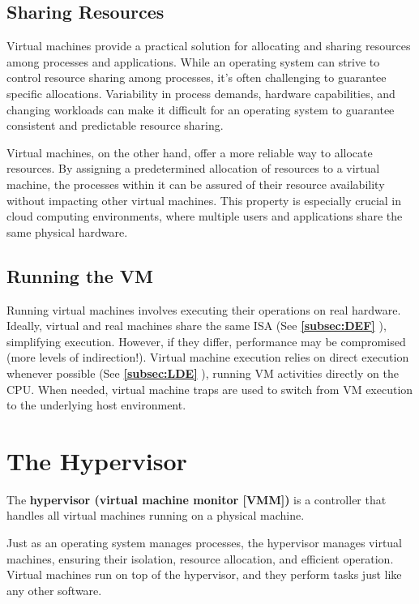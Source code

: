 \documentclass{report}
\newcommand{\definitionBegin}[1]{\begin{tcolorbox}[title={Definition: #1}]}
\newcommand{\definitionEnd}{\end{tcolorbox}}
\newcommand{\refto}[2]{\textbf{\ref{#1:#2} \nameref{#1:#2}}}
\begin{document}
\subsection{Sharing Resources}
Virtual machines provide a practical solution for allocating and sharing resources among processes
and applications. While an operating system can strive to control resource sharing among processes,
it's often challenging to guarantee specific allocations. Variability in process demands, hardware
capabilities, and changing workloads can make it difficult for an operating system to guarantee
consistent and predictable resource sharing. 

Virtual machines, on the other hand, offer a more reliable way to allocate resources. By assigning a
predetermined allocation of resources to a virtual machine, the processes within it can be assured
of their resource availability without impacting other virtual machines. This property is especially
crucial in cloud computing environments, where multiple users and applications share the same
physical hardware.


\subsection{Running the VM}
Running virtual machines involves executing their operations on real hardware. Ideally, virtual and
real machines share the same ISA (See \refto{subsec}{DEF}), simplifying execution. However, if they
differ, performance may be compromised (more levels of indirection!). Virtual machine execution
relies on direct execution whenever possible (See \refto{subsec}{LDE}), running VM activities
directly on the CPU. When needed, virtual machine traps are used to switch from VM execution to the
underlying host environment.





\section{The Hypervisor}
\definitionBegin{Hypervisor}
The \textbf{hypervisor (virtual machine monitor [VMM])} is a controller that handles all virtual
machines running on a physical machine.
\definitionEnd

Just as an operating system manages processes, the hypervisor manages virtual machines, ensuring
their isolation, resource allocation, and efficient operation. Virtual machines run on top of the
hypervisor, and they perform tasks just like any other software.
\end{document}
